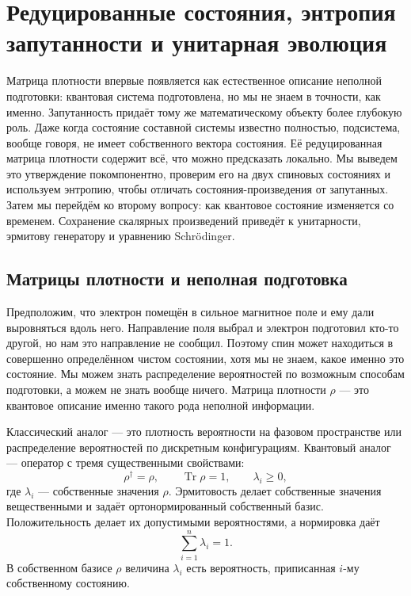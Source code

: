 \chapter{Редуцированные состояния, энтропия запутанности и унитарная эволюция}

Матрица плотности впервые появляется как естественное описание неполной подготовки: квантовая система подготовлена, но мы не знаем в точности, как именно. Запутанность придаёт тому же математическому объекту более глубокую роль. Даже когда состояние составной системы известно полностью, подсистема, вообще говоря, не имеет собственного вектора состояния. Её редуцированная матрица плотности содержит всё, что можно предсказать локально. Мы выведем это утверждение покомпонентно, проверим его на двух спиновых состояниях и используем энтропию, чтобы отличать состояния-произведения от запутанных. Затем мы перейдём ко второму вопросу: как квантовое состояние изменяется со временем. Сохранение скалярных произведений приведёт к унитарности, эрмитову генератору и уравнению Schr\"odinger.

\section{Матрицы плотности и неполная подготовка}

Предположим, что электрон помещён в сильное магнитное поле и ему дали выровняться вдоль него. Направление поля выбрал и электрон подготовил кто-то другой, но нам это направление не сообщил. Поэтому спин может находиться в совершенно определённом чистом состоянии, хотя мы не знаем, какое именно это состояние. Мы можем знать распределение вероятностей по возможным способам подготовки, а можем не знать вообще ничего. Матрица плотности \(\rho\) — это квантовое описание именно такого рода неполной информации.

Классический аналог — это плотность вероятности на фазовом пространстве или распределение вероятностей по дискретным конфигурациям. Квантовый аналог — оператор с тремя существенными свойствами:
\begin{equation}
\rho^\dagger=\rho,
\qquad
\operatorname{Tr}\rho=1,
\qquad
\lambda_i\geq 0,
\end{equation}
где \(\lambda_i\) — собственные значения \(\rho\). Эрмитовость делает собственные значения вещественными и задаёт ортонормированный собственный базис. Положительность делает их допустимыми вероятностями, а нормировка даёт
\begin{equation}
\sum_{i=1}^{n}\lambda_i=1.
\end{equation}
В собственном базисе \(\rho\) величина \(\lambda_i\) есть вероятность, приписанная \(i\)-му собственному состоянию.


